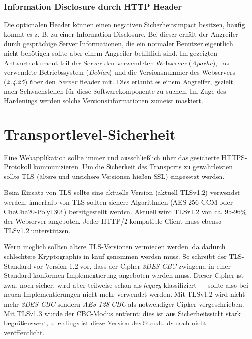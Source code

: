 \subsubsection{Information Disclosure durch HTTP Header}

Die optionalen Header können einen negativen Sicherheitsimpact besitzen, häufig kommt es z. B. zu einer Information Disclosure. Bei dieser erhält der Angreifer durch gesprächige Server Informationen, die ein normaler Benutzer eigentlich nicht benötigen sollte aber einem Angreifer behilflich sind. Im gezeigten Antwortdokument teil der Server den verwendeten Webserver (\textit{Apache}), das verwendete Betriebssystem (\textit{Debian}) und die Versionsnummer des Webservers (\textit{2.4.25}) über den \textit{Server} Header mit. Dies erlaubt es einem Angreifer, gezielt nach Schwachstellen für diese Softwarekomponente zu suchen. Im Zuge des Hardenings werden solche Versionsinformationen zumeist maskiert.

\section{Transportlevel-Sicherheit}

Eine Webapplikation sollte immer und ausschließlich über das gesicherte HTTPS-Protokoll kommunizieren. Um die Sicherheit des Transports zu gewährleisten sollte TLS (ältere und unsichere Versionen hießen SSL) eingesetzt werden.

Beim Einsatz von TLS sollte eine aktuelle Version (aktuell TLSv1.2) verwendet werden, innerhalb von TLS sollten sichere Algorithmen (AES-256-GCM oder ChaCha20-Poly1305) bereitgestellt werden. Aktuell wird TLSv1.2 von ca. 95-96\% der Webserver angeboten. Jeder HTTP/2 kompatible Client muss ebenso TLSv1.2 unterstützen.

Wenn möglich sollten ältere TLS-Versionen vermieden werden, da dadurch schlechtere Kryptographie in kauf genommen werden muss. So schreibt der TLS-Standard vor Version 1.2 vor, dass der Cipher \textit{3DES-CBC} zwingend in einer Standard-konformen Implementierung angeboten werden muss. Dieser Cipher ist zwar noch sicher, wird aber teilweise schon als \textit{legacy} klassifiziert --- sollte also bei neuen Implementierungen nicht mehr verwendet werden. Mit TLSv1.2 wird nicht mehr \textit{3DES-CBC} sondern \textit{AES-128-CBC} als notwendiger Cipher vorgeschrieben. Mit TLSv1.3 wurde der CBC-Modus entfernt: dies ist aus Sicherheitssicht stark begrüßenswert, allerdings ist diese Version des Standards noch nicht veröffentlicht.

